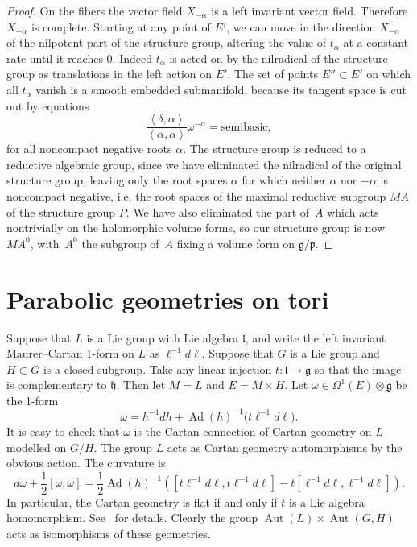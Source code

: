 \documentclass[11pt]{article}
\newcommand{\nForms}[2]{\ensuremath{\Omega^{#1} \left ( {#2} \right
    )}}
\DeclareMathOperator{\Ad}{Ad}
\DeclareMathOperator{\Aut}{Aut}
\newcommand{\LieG}{\ensuremath{\mathfrak{g}}}
\newcommand{\LieH}{\ensuremath{\mathfrak{h}}}
\newcommand{\LieL}{\ensuremath{\mathfrak{l}}}
\begin{document}
\begin{proof}
On the f\/ibers the vector f\/ield $X_{-\alpha}$ is a left invariant vector f\/ield.
Therefore $X_{-\alpha}$ is complete. Starting at any point of $E'$,
we can move in the direction $X_{-\alpha}$ of the nilpotent part
of the structure group, altering the value of $t_{\alpha}$ at a constant rate
until it reaches $0$. Indeed $t_{\alpha}$ is acted on by the nilradical
of the structure group as translations in the left action on $E'$. The set of points
$E'' \subset E'$ on which all $t_{\alpha}$ vanish is a smooth embedded
submanifold, because its tangent space is cut out by equations
\[
\frac{\left<\delta,\alpha\right>}{\left<\alpha,\alpha\right>} \omega^{-\alpha} = \text{semibasic},
\]
for all noncompact negative roots $\alpha.$ The structure group is
reduced to
a reductive algebraic group, since we have eliminated the nilradical
of the original structure group, leaving only the root spaces
$\alpha$ for which neither $\alpha$ nor $-\alpha$ is
noncompact negative, i.e.
the root spaces of the maximal reductive subgroup $MA$
of the structure group $P$. We have also eliminated the
part of~$A$ which acts nontrivially on the holomorphic
volume forms, so our structure group is now~$MA^0$,
with~$A^0$ the subgroup of~$A$ f\/ixing a volume form on
$\mathfrak{g}/\mathfrak{p}$.
\end{proof}
\setcounter{section}{7}
\setcounter{subsection}{0}
\setcounter{subsubsection}{0}
\setcounter{equation}{1}
\setcounter{section}{6}
\setcounter{subsection}{0}
\setcounter{example}{1}
\section{Parabolic geometries on tori}

\begin{example}\label{example:TranslationInvariant}
Suppose that $L$ is a Lie group with Lie algebra $\LieL$,
and write the left invariant Maurer--Cartan 1-form
on $L$ as $\ell^{-1}   d\ell$.
Suppose that $G$ is a Lie group and $H \subset G$
is a closed subgroup. Take any linear injection $t : \LieL \to \LieG$
so that the image is complementary to $\LieH$.
Then let $M=L$ and $E=M \times H$. Let $\omega \in \nForms{1}{E} \otimes  \LieG$
be the 1-form
\[
\omega = h^{-1}   dh + \Ad(h)^{-1}\big(t   \ell^{-1}   d\ell\big).
\]
It is easy to check that $\omega$ is the Cartan
connection of Cartan geometry on $L$ modelled on $G/H$.
The group $L$ acts as Cartan geometry automorphisms
by the obvious action. The curvature is
\[
d \omega + \frac{1}{2}\left[\omega,\omega\right]
=
\frac{1}{2}
\Ad(h)^{-1}\left(
\left[
t \ell^{-1}   d\ell,
t \ell^{-1}   d\ell
\right]
-
t
\left[
\ell^{-1}   d\ell,
\ell^{-1}   d\ell
\right]
\right).
\]
In particular, the Cartan geometry is f\/lat if and only if
$t$ is a Lie algebra homomorphism. See~\cite{Hammerl:2007}
for details. Clearly the group $\Aut(L) \times \Aut(G,H)$
acts as isomorphisms of these geometries.
\end{example}
\end{document}
